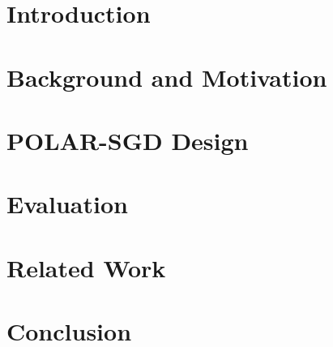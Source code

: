 \documentclass{article}
\theoremstyle{plain}
\theoremstyle{definition}
\theoremstyle{remark}
\newcommand{\sysname}{POLAR-SGD\xspace}
\begin{document}
    \section{Introduction}

    

    \section{Background and Motivation}

    


    \section{\sysname Design}
    



    \section{Evaluation}
    \label{evaluation}

    

    \section{Related Work}
    
    

    \section{Conclusion}
    
    





\newpage
\appendix
\onecolumn



\end{document}

